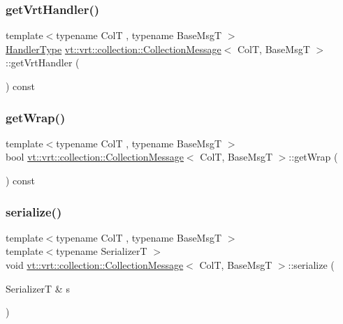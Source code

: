 \subsubsection{\texorpdfstring{get\+Vrt\+Handler()}{getVrtHandler()}}
{\footnotesize\ttfamily template$<$typename ColT , typename Base\+MsgT $>$ \\
\hyperlink{namespacevt_af64846b57dfcaf104da3ef6967917573}{Handler\+Type} \hyperlink{structvt_1_1vrt_1_1collection_1_1_collection_message}{vt\+::vrt\+::collection\+::\+Collection\+Message}$<$ ColT, Base\+MsgT $>$\+::get\+Vrt\+Handler (\begin{DoxyParamCaption}{ }\end{DoxyParamCaption}) const}

\mbox{\label{structvt_1_1vrt_1_1collection_1_1_collection_message_adb0f0904b4bd0646e51dc0a76c54d487}} 
\subsubsection{\texorpdfstring{get\+Wrap()}{getWrap()}}
{\footnotesize\ttfamily template$<$typename ColT , typename Base\+MsgT $>$ \\
bool \hyperlink{structvt_1_1vrt_1_1collection_1_1_collection_message}{vt\+::vrt\+::collection\+::\+Collection\+Message}$<$ ColT, Base\+MsgT $>$\+::get\+Wrap (\begin{DoxyParamCaption}{ }\end{DoxyParamCaption}) const}

\mbox{\label{structvt_1_1vrt_1_1collection_1_1_collection_message_a330305ca4c3bf4fec81d0f02637b9a59}} 
\subsubsection{\texorpdfstring{serialize()}{serialize()}}
{\footnotesize\ttfamily template$<$typename ColT , typename Base\+MsgT $>$ \\
template$<$typename SerializerT $>$ \\
void \hyperlink{structvt_1_1vrt_1_1collection_1_1_collection_message}{vt\+::vrt\+::collection\+::\+Collection\+Message}$<$ ColT, Base\+MsgT $>$\+::serialize (\begin{DoxyParamCaption}\item[{SerializerT \&}]{s }\end{DoxyParamCaption})}

